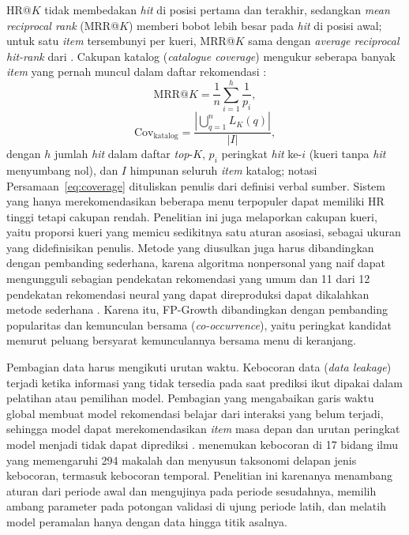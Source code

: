 HR@$K$ tidak membedakan \textit{hit} di posisi pertama dan terakhir, sedangkan \textit{mean reciprocal rank} (MRR@$K$) memberi bobot lebih besar pada \textit{hit} di posisi awal; untuk satu \textit{item} tersembunyi per kueri, MRR@$K$ sama dengan \textit{average reciprocal hit-rank} dari \citet*{deshpande2004itembased}. Cakupan katalog (\textit{catalogue coverage}) mengukur seberapa banyak \textit{item} yang pernah muncul dalam daftar rekomendasi \citep*{zangerle2022evaluating, latifi2021sessionaware}:
\begin{equation}
\mathrm{MRR@}K = \frac{1}{n}\sum_{i=1}^{h} \frac{1}{p_i},
\label{eq:mrr}
\end{equation}
\begin{equation}
\mathrm{Cov}_{\mathrm{katalog}} = \frac{\left|\bigcup_{q=1}^{n} L_K(q)\right|}{|I|},
\label{eq:coverage}
\end{equation}
dengan $h$ jumlah \textit{hit} dalam daftar \textit{top}-$K$, $p_i$ peringkat \textit{hit} ke-$i$ (kueri tanpa \textit{hit} menyumbang nol), dan $I$ himpunan seluruh \textit{item} katalog; notasi Persamaan~\eqref{eq:coverage} dituliskan penulis dari definisi verbal sumber. Sistem yang hanya merekomendasikan beberapa menu terpopuler dapat memiliki HR tinggi tetapi cakupan rendah. Penelitian ini juga melaporkan cakupan kueri, yaitu proporsi kueri yang memicu sedikitnya satu aturan asosiasi, sebagai ukuran yang didefinisikan penulis. Metode yang diusulkan juga harus dibandingkan dengan pembanding sederhana, karena algoritma nonpersonal yang naif dapat mengungguli sebagian pendekatan rekomendasi yang umum \citep*{cremonesi2010performance} dan 11 dari 12 pendekatan rekomendasi neural yang dapat direproduksi dapat dikalahkan metode sederhana \citep*{ferraridacrema2021troubling}. Karena itu, FP-Growth dibandingkan dengan pembanding popularitas dan kemunculan bersama (\textit{co-occurrence}), yaitu peringkat kandidat menurut peluang bersyarat kemunculannya bersama menu di keranjang.

Pembagian data harus mengikuti urutan waktu. Kebocoran data (\textit{data leakage}) terjadi ketika informasi yang tidak tersedia pada saat prediksi ikut dipakai dalam pelatihan atau pemilihan model. Pembagian yang mengabaikan garis waktu global membuat model rekomendasi belajar dari interaksi yang belum terjadi, sehingga model dapat merekomendasikan \textit{item} masa depan dan urutan peringkat model menjadi tidak dapat diprediksi \citep*{ji2023critical}. \citet*{kapoor2023leakage} menemukan kebocoran di 17 bidang ilmu yang memengaruhi 294 makalah dan menyusun taksonomi delapan jenis kebocoran, termasuk kebocoran temporal. Penelitian ini karenanya menambang aturan dari periode awal dan mengujinya pada periode sesudahnya, memilih ambang parameter pada potongan validasi di ujung periode latih, dan melatih model peramalan hanya dengan data hingga titik asalnya.

